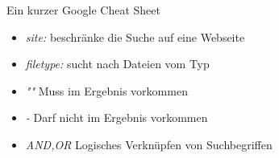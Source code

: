 \documentclass[aspectratio=169,shownotes]{beamer}
\begin{document}
\begin{frame}{Ein kurzer Google Cheat Sheet}
    \begin{itemize}
        \item \textit{site:} beschränke die Suche auf eine Webseite
        \item \textit{filetype:} sucht nach Dateien vom Typ
        \item \textit{""}  Muss im Ergebnis vorkommen
        \item \textit{-} Darf nicht im Ergebnis vorkommen
        \item \textit{AND,OR} Logisches Verknüpfen von Suchbegriffen
    \end{itemize}
\end{frame}
\end{document}
